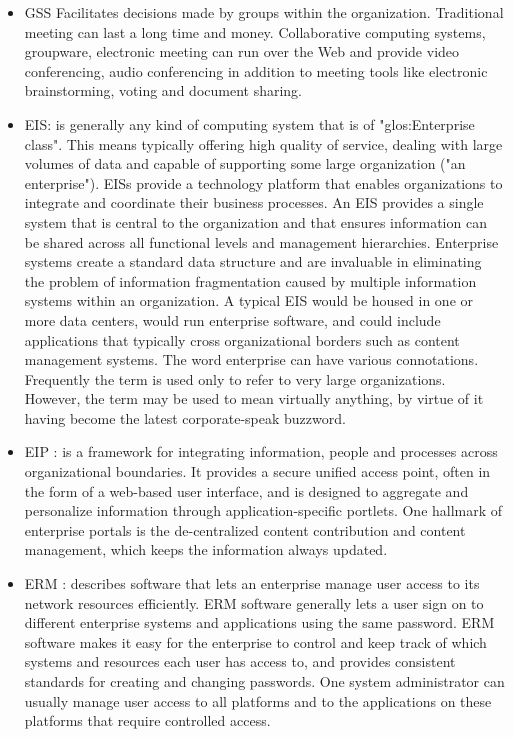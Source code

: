 \documentclass[12pt,a4paper,final,twoside,onecolumn,titlepage]{book}
\begin{document}
\begin{itemize}
\item \gls{GSS} \cite{MNAS02} Facilitates decisions made by groups within the organization. Traditional meeting can last a long time and money. Collaborative computing systems, groupware, electronic meeting can run over the Web and provide video conferencing, audio conferencing in addition to meeting tools like electronic brainstorming, voting and document sharing. 
\item \gls{EIS}\cite{Wiki-EIS}: is generally any kind of computing system that is of "\gls{glos:Enterprise} class". This means typically offering high quality of service, dealing with large volumes of data and capable of supporting some large organization ("an enterprise"). \gls{EIS}s provide a technology platform that enables organizations to integrate and coordinate their business processes. An \gls{EIS} provides a single system that is central to the organization and that ensures information can be shared across all functional levels and management hierarchies. Enterprise systems create a standard data structure and are invaluable in eliminating the problem of information fragmentation caused by multiple information systems within an organization. A typical \gls{EIS} would be housed in one or more data centers, would run enterprise software, and could include applications that typically cross organizational borders such as content management systems. The word enterprise can have various connotations. Frequently the term is used only to refer to very large organizations. However, the term may be used to mean virtually anything, by virtue of it having become the latest corporate-speak buzzword.
\item \gls{EIP} \cite{Wiki-EIP}: is a framework for integrating information, people and processes across organizational boundaries. It provides a secure unified access point, often in the form of a web-based user interface, and is designed to aggregate and personalize information through application-specific portlets. One hallmark of enterprise portals is the de-centralized content contribution and content management, which keeps the information always updated.
\item \gls{ERM} \cite{Wiki-ERM}: describes software that lets an enterprise manage user access to its network resources efficiently. \gls{ERM} software generally lets a user sign on to different enterprise systems and applications using the same password. \gls{ERM} software makes it easy for the enterprise to control and keep track of which systems and resources each user has access to, and provides consistent standards for creating and changing passwords. One system administrator can usually manage user access to all platforms and to the applications on these platforms that require controlled access.

\end{itemize}
\end{document}
